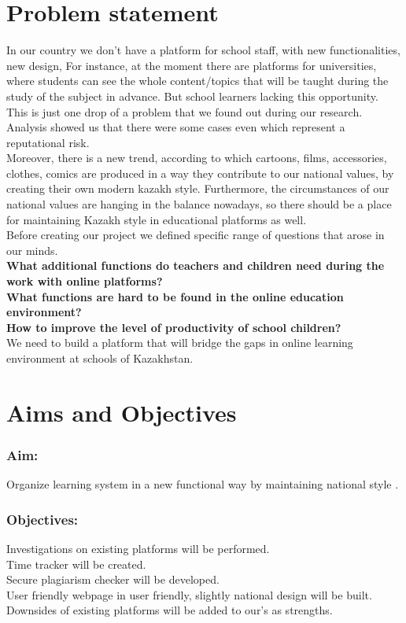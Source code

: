 \section{Problem statement}
In our country we don't have a platform for school staff, with new functionalities, new design,  For instance, at the moment there are platforms for universities, where students can see the whole content/topics that will be taught during the study of the subject in advance. But school learners lacking this opportunity. This is just one drop of a problem that we found out during our research. Analysis showed us that there were some cases even which represent a reputational risk.\\ 
Moreover, there is a new trend, according to which cartoons, films, accessories, clothes, comics are produced in a way they contribute to our national values, by creating their own modern kazakh style. Furthermore, the circumstances of our national values are hanging in the balance nowadays, so there should be a place for maintaining Kazakh style in educational platforms as well.\\
Before creating our project we defined specific range of questions that arose in our minds. \\
\textbf{What additional functions do teachers and children need during the work with online platforms? }\\
\textbf{What functions are hard to be found in the online education environment?}\\
\textbf{How to improve the level of productivity of school children?}\\
We need to build a platform that will bridge the gaps in online learning environment at schools of Kazakhstan. 
\newpage
\section{Aims and Objectives}
\subsubsection{Aim:}
Organize learning system in a new functional way by maintaining national style .
\subsubsection{Objectives: }
Investigations on existing platforms will be performed.\\
Time tracker will be created.\\
Secure plagiarism checker will be developed. \\
User friendly webpage in user friendly, slightly national design will be built. \\
Downsides of existing platforms will be added to our's as strengths.
